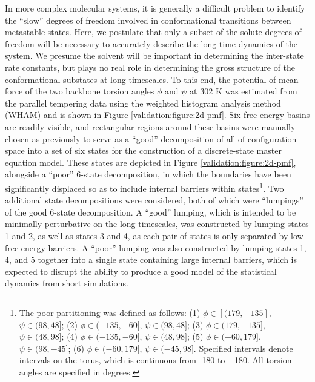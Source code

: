 In more complex molecular systems, it is generally a difficult problem to identify the ``slow'' degrees of freedom involved in conformational transitions between metastable states.  
Here, we postulate that only a subset of the solute degrees of freedom will be necessary to accurately describe the long-time dynamics of the system.  
We presume the solvent will be important in determining the inter-state rate constants, but plays no real role in determining the gross structure of the conformational substates at long timescales.  
To this end, the potential of mean force of the two backbone torsion angles $\phi$ and $\psi$ at 302 K was estimated from the parallel tempering data using the weighted histogram analysis method (WHAM) \cite{kumar:1992a,chodera:jctc:2006} and is shown in Figure \ref{validation:figure:2d-pmf}.  
Six free energy basins are readily visible, and rectangular regions around these basins were manually chosen as previously \cite{chodera:mms:2006} to serve as a ``good'' decomposition of all of configuration space into a set of six states for the construction of a discrete-state master equation model.
These states are depicted in Figure \ref{validation:figure:2d-pmf}, alongside a ``poor'' 6-state decomposition, in which the boundaries have been significantly displaced so as to include internal barriers within states\footnote{The poor partitioning was defined as follows: (1) $\phi \in [(179,-135]$, $\psi \in (98,48]$; (2) $\phi \in (-135,-60]$, $\psi \in (98,48]$; (3) $\phi \in (179,-135]$, $\psi \in (48,98]$; (4) $\phi \in (-135,-60]$, $\psi \in (48,98]$; (5) $\phi \in (-60,179]$, $\psi \in (98,-45]$; (6) $\phi \in (-60,179]$, $\psi \in (-45,98]$.  Specified intervals denote intervals on the torus, which is continuous from -180 to +180.  All torsion angles are specified in degrees.}.
Two additional state decompositions were considered, both of which were ``lumpings'' of the good 6-state decomposition.
A ``good'' lumping, which is intended to be minimally perturbative on the long timescales, was constructed by lumping states 1 and 2, as well as states 3 and 4, as each pair of states is only separated by low free energy barriers.
A ``poor'' lumping was also constructed by lumping states 1, 4, and 5 together into a single state containing large internal barriers, which is expected to disrupt the ability to produce a good model of the statistical dynamics from short simulations.



